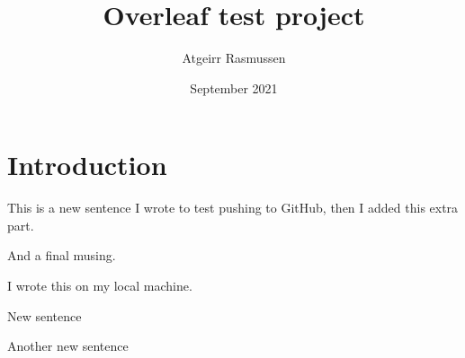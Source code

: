 \documentclass{article}
\title{Overleaf test project}
\author{Atgeirr Rasmussen}
\date{September 2021}
\begin{document}
\maketitle

\section{Introduction}

This is a new sentence I wrote to test pushing to GitHub, then I added this extra part.

And a final musing.


I wrote this on my local machine.


New sentence

Another new sentence
\end{document}
